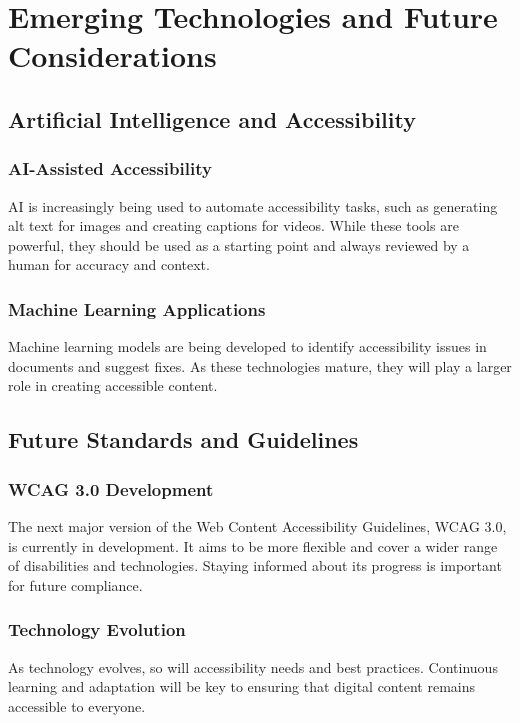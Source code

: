 \section{Emerging Technologies and Future Considerations}\label{ch15:sec:emerging-tech}

\subsection{Artificial Intelligence and Accessibility}\label{ch15:ssec:ai-a11y}

\subsubsection{AI-Assisted Accessibility}\label{ch15:sssec:ai-assisted-a11y}
AI is increasingly being used to automate accessibility tasks, such as generating alt text for images and creating captions for videos. While these tools are powerful, they should be used as a starting point and always reviewed by a human for accuracy and context.

\subsubsection{Machine Learning Applications}\label{ch15:sssec:ml-apps}
Machine learning models are being developed to identify accessibility issues in documents and suggest fixes. As these technologies mature, they will play a larger role in creating accessible content.

\subsection{Future Standards and Guidelines}\label{ch15:ssec:future-standards}

\subsubsection{WCAG 3.0 Development}\label{ch15:sssec:wcag3}
The next major version of the Web Content Accessibility Guidelines, WCAG 3.0, is currently in development. It aims to be more flexible and cover a wider range of disabilities and technologies. Staying informed about its progress is important for future compliance.

\subsubsection{Technology Evolution}\label{ch15:sssec:tech-evolution}
As technology evolves, so will accessibility needs and best practices. Continuous learning and adaptation will be key to ensuring that digital content remains accessible to everyone.

